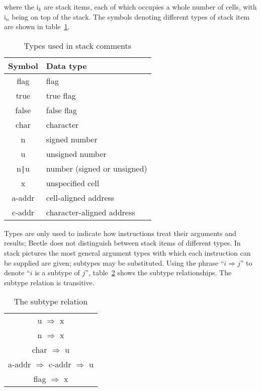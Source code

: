 \documentclass[english]{article}
\newcommand{\spic}[1]{{\spfont\setlength{\baselineskip}{\normalbaselineskip}#1\/}}
\begin{document}
where the \spic{i$_k$} are stack items, each of which occupies a whole number of
cells, with \spic{i$_n$} being on top of the stack. The symbols denoting
different types of stack item are shown in table~\ref{typetable}.

\begin{table}[htbp]
\begin{center}
\begin{tabular}{cl} \toprule
\bf Symbol & \bf Data type \\ \midrule
\spic{flag} & flag \\
\spic{true} & true flag \\
\spic{false} & false flag \\
\spic{char} & character \\
\spic{n} & signed number \\
\spic{u} & unsigned number \\
\spic{n{\tt |}u} & number (signed or unsigned) \\
\spic{x} & unspecified cell \\
\spic{a-addr} & cell-aligned address \\
\spic{c-addr} & character-aligned address \\ \bottomrule
\end{tabular}
\caption{\label{typetable}Types used in stack comments}
\end{center}
\end{table}

Types are only used to indicate how instructions treat their arguments and
results; Beetle does not distinguish between stack items of different types. In
stack pictures the most general argument types with which each instruction can
be supplied are given; subtypes may be substituted. Using the phrase ``$i
\Rightarrow j$'' to denote ``$i$\/ is a subtype of $j$\/'', table~\ref{reltable}
shows the subtype relationships. The subtype relation is transitive.

\begin{table}[htbp]
\begin{center}
\begin{tabular}{c} \toprule
\spic{u} $\Rightarrow$ \spic{x} \\
\spic{n} $\Rightarrow$ \spic{x} \\
\spic{char} $\Rightarrow$ \spic{u} \\
\spic{a-addr} $\Rightarrow$ \spic{c-addr} $\Rightarrow$ \spic{u} \\
\spic{flag} $\Rightarrow$ \spic{x} \\ \bottomrule
\end{tabular}
\caption{\label{reltable}The subtype relation}
\end{center}
\end{table}
\end{document}
